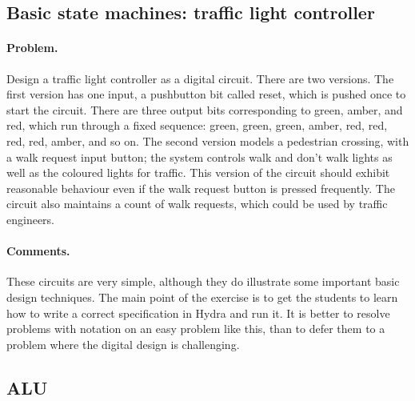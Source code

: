 \documentclass[submission,copyright,creativecommons]{eptcs}
\begin{document}
\subsection{Basic state machines: traffic light controller}

\paragraph{Problem.}
Design a traffic light controller as a digital circuit.  There are
two versions.  The first version has one input, a pushbutton bit
called reset, which is pushed once to start the circuit.  There are
three output bits corresponding to green, amber, and red, which run
through a fixed sequence: green, green, green, amber, red, red,
red, red, amber, and so on.  The second version models a pedestrian
crossing, with a walk request input button; the system controls
walk and don't walk lights as well as the coloured lights for
traffic.  This version of the circuit should exhibit reasonable
behaviour even if the walk request button is pressed frequently.
The circuit also maintains a count of walk requests, which could be
used by traffic engineers.

\paragraph{Comments.}
These circuits are very simple, although they do illustrate some
important basic design techniques.  The main point of the exercise
is to get the students to learn how to write a correct
specification in Hydra and run it.  It is better to resolve
problems with notation on an easy problem like this, than to defer
them to a problem where the digital design is challenging.

\subsection{ALU}
\end{document}
